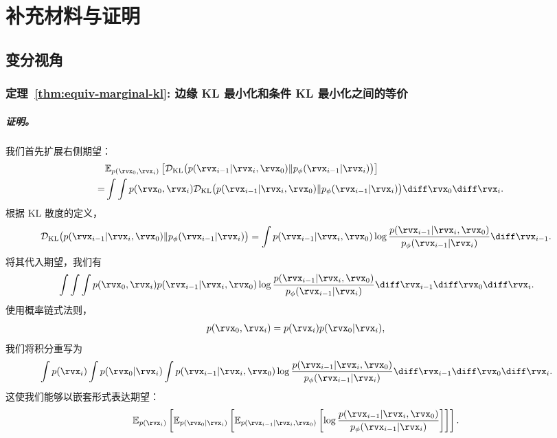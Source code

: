 \chapter{补充材料与证明}\label{app:proof}
\section{变分视角}\label{app-sec:var-proof}


\subsection{定理~\ref{thm:equiv-marginal-kl}: 边缘 KL 最小化和条件 KL 最小化之间的等价}\label{subsec:proof-equiv-marginal-kl}
\paragraph{\textit{证明。}} 

我们首先扩展右侧期望：
\begin{align*}
    &\mathbb{E}_{p(\rvx_0, \rvx_i)}\left[
    \mathcal{D}_{\text{KL}} \big(p(\rvx_{i-1}|\rvx_i, \rvx_0) \| p_\phi(\rvx_{i-1}|\rvx_i)\big)
    \right]
    \\
    =& \int \int p(\rvx_0, \rvx_i)
    \mathcal{D}_{\text{KL}} \big(p(\rvx_{i-1}|\rvx_i, \rvx_0) \| p_\phi(\rvx_{i-1}|\rvx_i)\big)
    \diff\rvx_0 \diff\rvx_i.
\end{align*}
根据 KL 散度的定义，
\begin{align*}
    &\mathcal{D}_{\text{KL}} \big(p(\rvx_{i-1}|\rvx_i, \rvx_0) \| p_\phi(\rvx_{i-1}|\rvx_i)\big)
    = \int p(\rvx_{i-1}|\rvx_i, \rvx_0)
    \log \frac{p(\rvx_{i-1}|\rvx_i, \rvx_0)}{p_\phi(\rvx_{i-1}|\rvx_i)}
    \diff\rvx_{i-1}.
\end{align*}
将其代入期望，我们有
\begin{align*}
    &\int \int \int p(\rvx_0, \rvx_i)  p(\rvx_{i-1}|\rvx_i, \rvx_0)
    \log \frac{p(\rvx_{i-1}|\rvx_i, \rvx_0)}{p_\phi(\rvx_{i-1}|\rvx_i)}
    \diff\rvx_{i-1} \diff\rvx_0 \diff\rvx_i.
\end{align*}
使用概率链式法则，
\begin{align*}
    p(\rvx_0, \rvx_i)
    &= p(\rvx_i)   p(\rvx_0|\rvx_i),
\end{align*}
我们将积分重写为
\begin{align*}
    &\int p(\rvx_i) \int p(\rvx_0|\rvx_i) \int p(\rvx_{i-1}|\rvx_i, \rvx_0)
    \log \frac{p(\rvx_{i-1}|\rvx_i, \rvx_0)}{p_\phi(\rvx_{i-1}|\rvx_i)}
    \diff\rvx_{i-1} \diff\rvx_0 \diff\rvx_i.
\end{align*}
这使我们能够以嵌套形式表达期望：
\begin{align*}
    &\mathbb{E}_{p(\rvx_i)} \left[
    \mathbb{E}_{p(\rvx_0|\rvx_i)} \left[
    \mathbb{E}_{p(\rvx_{i-1}|\rvx_i, \rvx_0)} \left[
    \log \frac{p(\rvx_{i-1}|\rvx_i, \rvx_0)}{p_\phi(\rvx_{i-1}|\rvx_i)}
    \right]
    \right]
    \right].
\end{align*}

